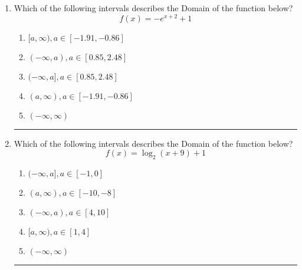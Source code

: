 \documentclass[14pt]{extbook}
\newcommand{\litem}[1]{\item#1\hspace*{-1cm}\rule{\textwidth}{0.4pt}}
\begin{document}
\begin{enumerate}
{\begin{enumerate}[label=\Alph*.]
\end{enumerate} }
\litem{
Which of the following intervals describes the Domain of the function below?\[ f(x) = -e^{x+2}+1 \]\begin{enumerate}[label=\Alph*.]
\item \( [a, \infty), a \in [-1.91, -0.86] \)
\item \( (-\infty, a), a \in [0.85, 2.48] \)
\item \( (-\infty, a], a \in [0.85, 2.48] \)
\item \( (a, \infty), a \in [-1.91, -0.86] \)
\item \( (-\infty, \infty) \)

\end{enumerate} }
\litem{
Which of the following intervals describes the Domain of the function below?\[ f(x) = \log_2{(x+9)}+1 \]\begin{enumerate}[label=\Alph*.]
\item \( (-\infty, a], a \in [-1, 0] \)
\item \( (a, \infty), a \in [-10, -8] \)
\item \( (-\infty, a), a \in [4, 10] \)
\item \( [a, \infty), a \in [1, 4] \)
\item \( (-\infty, \infty) \)

\end{enumerate} }
\end{enumerate}
\end{document}
